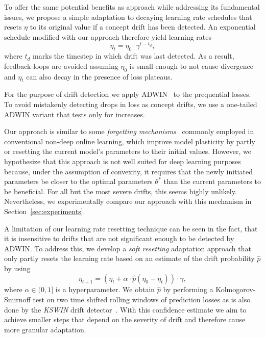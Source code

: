 \documentclass[letterpaper]{article} %
\begin{document}
To offer the same potential benefits as \citet{kunchevaAdaptiveLearningRate2008} approach while addressing its fundamental issues, we propose a simple adaptation to decaying learning rate schedules that resets $\eta$ to its original value if a concept drift has been detected.
An exponential schedule modified with our approach therefore yield learning rates
\begin{equation}
	\eta_t = \eta_0 \cdot \gamma^{t-t_d},
\end{equation}\label{eq:drift_reset}
where $t_d$ marks the timestep in which drift was last detected.
As a result, feedback-loops are avoided assuming $\eta_0$ is small enough to not cause divergence and $\eta_t$ can also decay in the presence of loss plateaus.

For the purpose of drift detection we apply ADWIN~\cite{bifetLearningTimeChangingData2007} to the prequential losses.
To avoid mistakenly detecting drops in loss as concept drifts, we use a one-tailed ADWIN variant that tests only for increases.

Our approach is similar to some \textit{forgetting mechanisms}~\cite{gamaSurveyConceptDrift2014} commonly employed in conventional non-deep online learning, which improve model plasticity by partly~\cite{bifetAdaptiveLearningEvolving2009} or resetting the current model's parameters to their initial values.
However, we hypothesize that this approach is not well suited for deep learning purposes because, under the assumption of convexity, it requires that the newly initiated parameters be closer to the optimal parameters $\theta^*$ than the current parameters to be beneficial.
For all but the most severe drifts, this seems highly unlikely.
Nevertheless, we experimentally compare our approach with this mechanism in Section~\ref{sec:experiments}.

A limitation of our learning rate resetting technique can be seen in the fact, that it is insensitive to drifts that are not significant enough to be detected by ADWIN.
To address this, we develop a \textit{soft resetting} adaptation approach that only partly resets the learning rate based on an estimate of the drift probability $\hat{p}$ by using
\begin{equation}
	\eta_{t+1} = (\eta_t + \alpha\cdot \hat{p}(\eta_0 - \eta_t)) \cdot \gamma,
\end{equation}\label{eq:soft_drift_reset}
where $\alpha \in (0, 1]$ is a hyperparameter.
We obtain $\hat{p}$ by performing a Kolmogorov-Smirnoff test on two time shifted rolling windows of prediction losses as is also done by the \textit{KSWIN} drift detector~\cite{raabReactiveSoftPrototype2020a}.
With this confidence estimate we aim to achieve smaller steps that depend on the severity of drift and therefore cause more granular adaptation.
\end{document}
